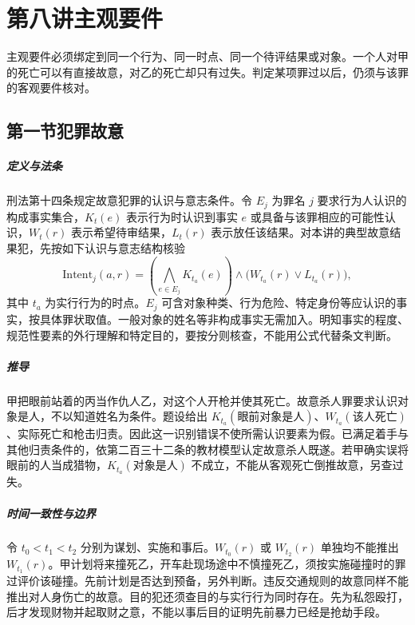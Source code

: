 \chapter{第八讲\quad 主观要件}
\label{lecture:08}
\par

主观要件必须绑定到同一个行为、同一时点、同一个待评结果或对象。一个人对甲的死亡可以有直接故意，对乙的死亡却只有过失。判定某项罪过以后，仍须与该罪的客观要件核对。

\section{第一节\quad 犯罪故意}

\paragraph{定义与法条}
刑法第十四条规定故意犯罪的认识与意志条件。令 $E_j$ 为罪名 $j$ 要求行为人认识的构成事实集合，$K_t(e)$ 表示行为时认识到事实 $e$ 或具备与该罪相应的可能性认识，$W_t(r)$ 表示希望待审结果，$L_t(r)$ 表示放任该结果。对本讲的典型故意结果犯，先按如下认识与意志结构核验
\[
\mathrm{Intent}_j(a,r)
  =\left(\bigwedge_{e\in E_j}K_{t_a}(e)\right)
     \land\bigl(W_{t_a}(r)\lor L_{t_a}(r)\bigr),
\]
其中 $t_a$ 为实行行为的时点。$E_j$ 可含对象种类、行为危险、特定身份等应认识的事实，按具体罪状取值。一般对象的姓名等非构成事实无需加入。明知事实的程度、规范性要素的外行理解和特定目的，要按分则核查，不能用公式代替条文判断。

\paragraph{推导}
甲把眼前站着的丙当作仇人乙，对这个人开枪并使其死亡。故意杀人罪要求认识对象是人，不以知道姓名为条件。题设给出 $K_{t_a}(\text{眼前对象是人})$、$W_{t_a}(\text{该人死亡})$、实际死亡和枪击归责。因此这一识别错误不使所需认识要素为假。已满足着手与其他归责条件的，依第二百三十二条的教材模型认定故意杀人既遂。若甲确实误将眼前的人当成猎物，$K_{t_a}(\text{对象是人})$ 不成立，不能从客观死亡倒推故意，另查过失。

\paragraph{时间一致性与边界}
令 $t_0<t_1<t_2$ 分别为谋划、实施和事后。$W_{t_0}(r)$ 或 $W_{t_2}(r)$ 单独均不能推出 $W_{t_1}(r)$。甲计划将来撞死乙，开车赴现场途中不慎撞死乙，须按实施碰撞时的罪过评价该碰撞。先前计划是否达到预备，另外判断。违反交通规则的故意同样不能推出对人身伤亡的故意。目的犯还须查目的与实行行为同时存在。先为私怨殴打，后才发现财物并起取财之意，不能以事后目的证明先前暴力已经是抢劫手段。

